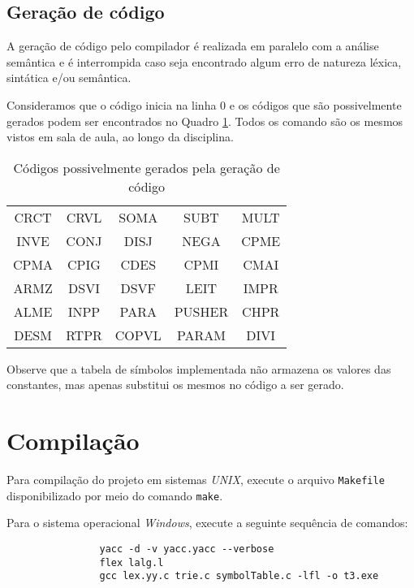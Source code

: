 \documentclass{article}
\begin{document}

	\subsection{Geração de código} %
	\label{sub:geracao_de_codigo}
		A geração de código pelo compilador é realizada em paralelo com a análise semântica e é interrompida caso seja encontrado algum erro de natureza léxica, sintática e/ou semântica.

		Consideramos que o código inicia na linha 0 e os códigos que são possivelmente gerados podem ser encontrados no Quadro \ref{tab:codigos}. Todos os comando são os mesmos vistos em sala de aula, ao longo da disciplina.

		\begin{table}[h]
			\centering	
			\ttfamily
			\begin{tabular}{c c c c c}
				\hline
				CRCT & CRVL & SOMA & SUBT & MULT \\
				INVE & CONJ & DISJ & NEGA & CPME \\
				CPMA & CPIG & CDES & CPMI & CMAI \\
				ARMZ & DSVI & DSVF & LEIT & IMPR \\
				ALME & INPP & PARA & PUSHER & CHPR \\
				DESM & RTPR & COPVL & PARAM & DIVI \\
				\hline
			\end{tabular}
			\caption{Códigos possivelmente gerados pela geração de código}
			\label{tab:codigos}
		\end{table}
	
	Observe que a tabela de símbolos implementada não armazena os valores das constantes, mas apenas substitui os mesmos no código a ser gerado.


\section{Compilação} %
\label{sec:compilacao}
	Para compilação do projeto em sistemas \emph{UNIX}, execute o arquivo \verb=Makefile= disponibilizado por meio do comando \verb=make=. 

	Para o sistema operacional \emph{Windows}, execute a seguinte sequência de comandos:

	\begin{center}
		\begin{minipage}[ht]{0.5\textwidth}
			\begin{verbatim}
				yacc -d -v yacc.yacc --verbose 
				flex lalg.l
				gcc lex.yy.c trie.c symbolTable.c -lfl -o t3.exe
			\end{verbatim}
		\end{minipage}
	\end{center}
\end{document}
